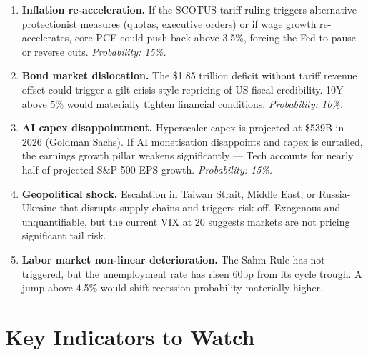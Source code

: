 \documentclass{wilson-report}
\begin{document}
\begin{enumerate}[leftmargin=1.2em, itemsep=4pt]
  \item \textbf{Inflation re-acceleration.} If the SCOTUS tariff ruling triggers alternative protectionist measures (quotas, executive orders) or if wage growth re-accelerates, core PCE could push back above 3.5\%, forcing the Fed to pause or reverse cuts. \textit{Probability: 15\%.}
  \item \textbf{Bond market dislocation.} The \$1.85 trillion deficit without tariff revenue offset could trigger a gilt-crisis-style repricing of US fiscal credibility. 10Y above 5\% would materially tighten financial conditions. \textit{Probability: 10\%.}
  \item \textbf{AI capex disappointment.} Hyperscaler capex is projected at \$539B in 2026 (Goldman Sachs). If AI monetisation disappoints and capex is curtailed, the earnings growth pillar weakens significantly --- Tech accounts for nearly half of projected S\&P 500 EPS growth. \textit{Probability: 15\%.}
  \item \textbf{Geopolitical shock.} Escalation in Taiwan Strait, Middle East, or Russia-Ukraine that disrupts supply chains and triggers risk-off. Exogenous and unquantifiable, but the current VIX at 20 suggests markets are not pricing significant tail risk.
  \item \textbf{Labor market non-linear deterioration.} The Sahm Rule has not triggered, but the unemployment rate has risen 60bp from its cycle trough. A jump above 4.5\% would shift recession probability materially higher.
\end{enumerate}

\section{Key Indicators to Watch}
\end{document}
